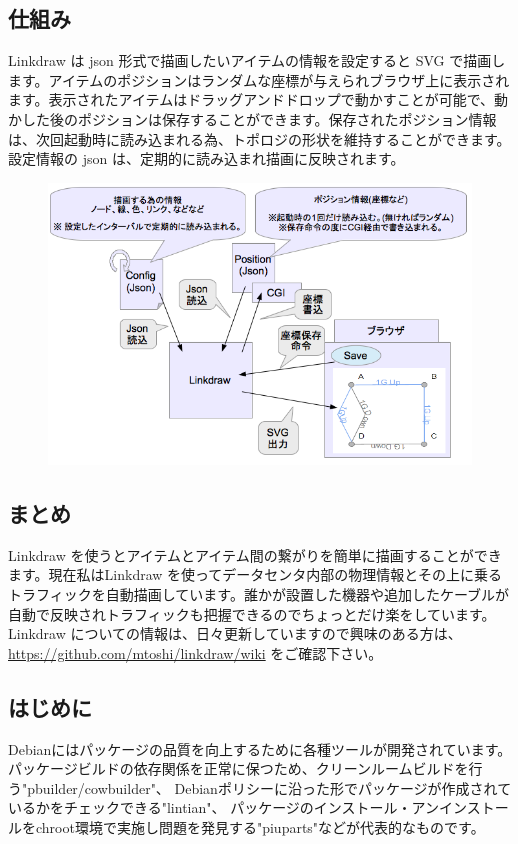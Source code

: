 \documentclass[mingoth,a4paper,twoside]{jsarticle}
\begin{document}
\subsection{仕組み}

Linkdraw は json 形式で描画したいアイテムの情報を設定すると SVG で描画します。アイテムのポジションはランダムな座標が与えられブラウザ上に表示されます。表示されたアイテムはドラッグアンドドロップで動かすことが可能で、動かした後のポジションは保存することができます。保存されたポジション情報は、次回起動時に読み込まれる為、トポロジの形状を維持することができます。設定情報の json は、定期的に読み込まれ描画に反映されます。

\begin{figure}[h!]
\centering
\includegraphics[width=0.6\hsize]{image2013-gum/mtoshilinkdraw2013061122150-img3.png}
\end{figure}


\subsection{まとめ}

Linkdraw を使うとアイテムとアイテム間の繋がりを簡単に描画することができます。現在私はLinkdraw を使ってデータセンタ内部の物理情報とその上に乗るトラフィックを自動描画しています。誰かが設置した機器や追加したケーブルが自動で反映されトラフィックも把握できるのでちょっとだけ楽をしています。Linkdraw についての情報は、日々更新していますので興味のある方は、\url{https://github.com/mtoshi/linkdraw/wiki} をご確認下さい。

\pagebreak

\subsection{はじめに}

Debianにはパッケージの品質を向上するために各種ツールが開発されています。
パッケージビルドの依存関係を正常に保つため、クリーンルームビルドを行う"pbuilder/cowbuilder"、
Debianポリシーに沿った形でパッケージが作成されているかをチェックできる"lintian"、
パッケージのインストール・アンインストールをchroot環境で実施し問題を発見する"piuparts"などが代表的なものです。
\end{document}
